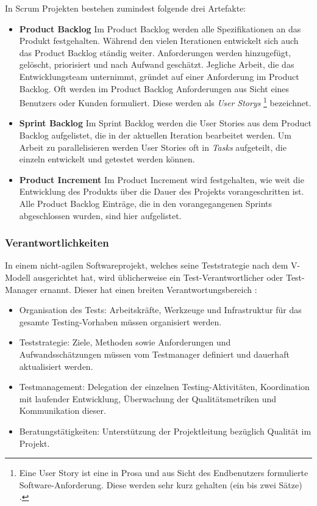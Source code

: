 In Scrum Projekten bestehen zumindest folgende drei Artefakte:

\begin{itemize}
\item \textbf{Product Backlog} Im Product Backlog werden alle Spezifikationen an das Produkt festgehalten. Während den vielen Iterationen entwickelt sich auch das Product Backlog ständig weiter. Anforderungen werden hinzugefügt, gelöscht, priorisiert und nach Aufwand geschätzt. Jegliche Arbeit, die das Entwicklungsteam unternimmt, gründet auf einer Anforderung im Product Backlog. Oft werden im Product Backlog Anforderungen aus Sicht eines Benutzers oder Kunden formuliert. Diese werden als \textit{User Storys} \footnote{Eine User Story ist eine in Prosa und aus Sicht des Endbenutzers formulierte Software-Anforderung. Diese werden sehr kurz gehalten (ein bis zwei Sätze) \cite{cohn_user_2004}.} bezeichnet.
\item \textbf{Sprint Backlog} Im Sprint Backlog werden die User Stories aus dem Product Backlog aufgelistet, die in der aktuellen Iteration bearbeitet werden. Um Arbeit zu parallelisieren werden User Stories oft in \textit{Tasks} aufgeteilt, die einzeln entwickelt und getestet werden können.
\item \textbf{Product Increment} Im Product Increment wird festgehalten, wie weit die Entwicklung des Produkts über die Dauer des Projekts vorangeschritten ist. Alle Product Backlog Einträge, die in den vorangegangenen Sprints abgeschlossen wurden, sind hier aufgelistet.
\end{itemize}


\subsubsection{Verantwortlichkeiten}
In einem nicht-agilen Softwareprojekt, welches seine Teststrategie nach dem V-Modell ausgerichtet hat, wird üblicherweise ein Test-Verantwortlicher oder Test-Manager ernannt. Dieser hat einen breiten Verantwortungsbereich \cite{linz_testing_2014}:

\begin{itemize}
\item Organisation des Tests: Arbeitskräfte, Werkzeuge und Infrastruktur für das gesamte Testing-Vorhaben müssen organisiert werden.
\item Teststrategie: Ziele, Methoden sowie Anforderungen und Aufwandsschätzungen müssen vom Testmanager definiert und dauerhaft aktualisiert werden.
\item Testmanagement: Delegation der einzelnen Testing-Aktivitäten, Koordination mit laufender Entwicklung, Überwachung der Qualitätsmetriken und Kommunikation dieser.
\item Beratungstätigkeiten: Unterstützung der Projektleitung bezüglich Qualität im Projekt.
\end{itemize}

